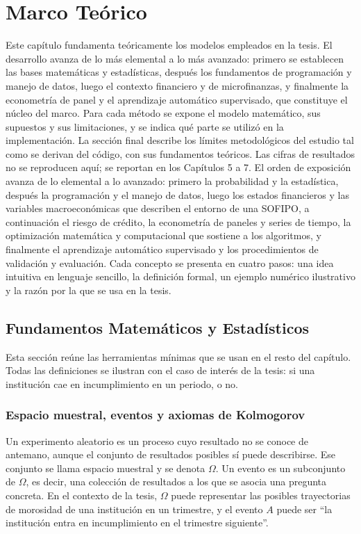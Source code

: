 \chapter{Marco Teórico}

Este capítulo fundamenta teóricamente los modelos empleados en la tesis. El desarrollo avanza de lo más elemental a lo más avanzado: primero se establecen las bases matemáticas y estadísticas, después los fundamentos de programación y manejo de datos, luego el contexto financiero y de microfinanzas, y finalmente la econometría de panel y el aprendizaje automático supervisado, que constituye el núcleo del marco. Para cada método se expone el modelo matemático, sus supuestos y sus limitaciones, y se indica qué parte se utilizó en la implementación. La sección final describe los límites metodológicos del estudio tal como se derivan del código, con sus fundamentos teóricos. Las cifras de resultados no se reproducen aquí; se reportan en los Capítulos 5 a 7. El orden de exposición avanza de lo elemental a lo avanzado: primero la probabilidad y la estadística, después la programación y el manejo de datos, luego los estados financieros y las variables macroeconómicas que describen el entorno de una SOFIPO, a continuación el riesgo de crédito, la econometría de paneles y series de tiempo, la optimización matemática y computacional que sostiene a los algoritmos, y finalmente el aprendizaje automático supervisado y los procedimientos de validación y evaluación. Cada concepto se presenta en cuatro pasos: una idea intuitiva en lenguaje sencillo, la definición formal, un ejemplo numérico ilustrativo y la razón por la que se usa en la tesis.

\section{Fundamentos Matemáticos y Estadísticos}\label{sec:fund_mat}

Esta sección reúne las herramientas mínimas que se usan en el resto del capítulo. Todas las definiciones se ilustran con el caso de interés de la tesis: si una institución cae en incumplimiento en un periodo, o no.

\subsection{Espacio muestral, eventos y axiomas de Kolmogorov}
Un experimento aleatorio es un proceso cuyo resultado no se conoce de antemano, aunque el conjunto de resultados posibles sí puede describirse. Ese conjunto se llama espacio muestral y se denota $\Omega$. Un evento es un subconjunto de $\Omega$, es decir, una colección de resultados a los que se asocia una pregunta concreta. En el contexto de la tesis, $\Omega$ puede representar las posibles trayectorias de morosidad de una institución en un trimestre, y el evento $A$ puede ser ``la institución entra en incumplimiento en el trimestre siguiente''.

